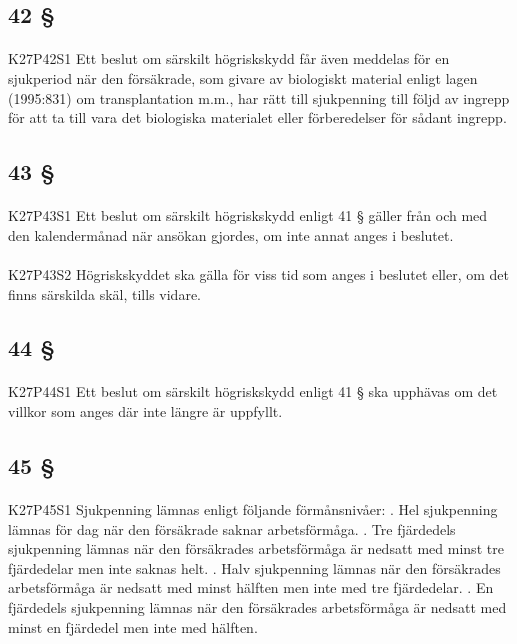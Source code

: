 \documentclass[a4paper,notitlepage,openany,10pt]{book}
\begin{document}
\subsection*{42 §}
\paragraph*{}
{\tiny K27P42S1}
Ett beslut om särskilt högriskskydd får även meddelas för en sjukperiod när den försäkrade, som givare av biologiskt material enligt lagen (1995:831) om transplantation m.m., har rätt till sjukpenning till följd av ingrepp för att ta till vara det biologiska materialet eller förberedelser för sådant ingrepp.
\subsection*{43 §}
\paragraph*{}
{\tiny K27P43S1}
Ett beslut om särskilt högriskskydd enligt 41 § gäller från och med den kalendermånad när ansökan gjordes, om inte annat anges i beslutet.
\paragraph*{}
{\tiny K27P43S2}
Högriskskyddet ska gälla för viss tid som anges i beslutet eller, om det finns särskilda skäl, tills vidare.
\subsection*{44 §}
\paragraph*{}
{\tiny K27P44S1}
Ett beslut om särskilt högriskskydd enligt 41 § ska upphävas om det villkor som anges där inte längre är uppfyllt.
\subsection*{45 §}
\paragraph*{}
{\tiny K27P45S1}
Sjukpenning lämnas enligt följande förmånsnivåer:
. Hel sjukpenning lämnas för dag när den försäkrade saknar arbetsförmåga.
. Tre fjärdedels sjukpenning lämnas när den försäkrades arbetsförmåga är nedsatt med minst tre fjärdedelar men inte saknas helt.
. Halv sjukpenning lämnas när den försäkrades arbetsförmåga är nedsatt med minst hälften men inte med tre fjärdedelar.
. En fjärdedels sjukpenning lämnas när den försäkrades arbetsförmåga är nedsatt med minst en fjärdedel men inte med hälften.
\end{document}
